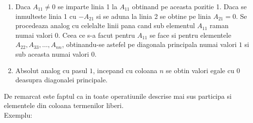 \documentclass{article}
\begin{document}
        \begin{enumerate}
            \item Daca $A_{11}\neq 0$ se imparte linia 1 la $A_{11}$ obtinand pe aceasta pozitie 1. Daca se inmulteste linia 1 cu $-A_{21}$ si se aduna la linia
                2 se obtine pe linia $A_{21} = 0$. Se procedeaza analog cu celelalte linii pana cand sub elementul $A_{11}$ raman numai valori $0$. Ceea ce s-a
                facut pentru $A_{11}$ se face si pentru elementele $A_{22}, A_{33}, \dots ,A_{nn}$, obtinandu-se astefel pe diagonala principala numai valori $1$ si sub aceasta numai valori $0$.
            \item Absolut analog cu pasul $1$, incepand cu coloana $n$ se obtin valori egale cu $0$ deasupra diagonalei principale.
        \end{enumerate}
        De remarcat este faptul ca in toate operatiunile descrise mai sus participa si elementele din coloana termenilor liberi. \\
		Exemplu: \\
\end{document}
